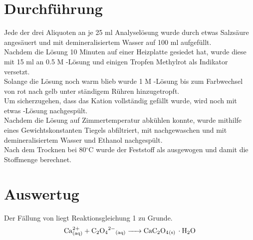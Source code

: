 \documentclass[12pt]{scrartcl} %
\newcommand{\celsius}{^{\circ}\mathrm{C}} %
\begin{document}
\section{Durchführung}
Jede der drei Aliquoten an je 25 ml Analyselösung wurde durch etwas Salzsäure angesäuert und mit demineralisiertem Wasser auf 100 ml aufgefüllt.\\
Nachdem die Lösung 10 Minuten auf einer Heizplatte gesiedet hat, wurde diese mit 15 ml an 0.5 M -Lösung und einigen Tropfen Methylrot als Indikator versetzt.\\
Solange die Lösung noch warm blieb wurde 1 M -Lösung bis zum Farbwechsel von rot nach gelb unter ständigem Rühren hinzugetropft.\\
Um sicherzugehen, dass das Kation vollständig gefällt wurde, wird noch mit etwas -Lösung nachgespült.\\
Nachdem die Lösung auf Zimmertemperatur abkühlen konnte, wurde mithilfe eines Gewichtskonstanten Tiegels abfiltriert, mit  nachgewaschen und mit demineralisiertem Wasser und Ethanol nachgespült.\\
Nach dem Trocknen bei 80$\celsius$ wurde der Feststoff als  ausgewogen und damit die Stoffmenge berechnet.\\

\section{Auswertug}

Der Fällung von  liegt Reaktionsgleichung 1 zu Grunde.\\
\begin{equation}
  \ce{Ca^{2+}_{(aq)} + C2O4^{2-}_{(aq)} -> CaC2O4_{(s)} \cdot H2O}
\end{equation}
\end{document}
